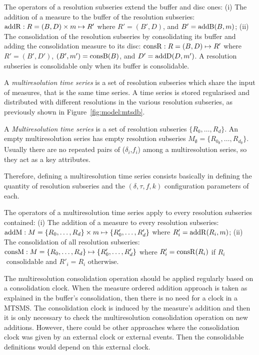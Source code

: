The operators of a resolution subseries extend the buffer and disc
ones: (i) The addition of a measure to the buffer of the resolution
subseries: $\operatorname{addR} : R=(B,D) \times m \mapsto R'$ where $R'= (B',D)$,
and $B'= \operatorname{addB}(B,m)$; (ii) The consolidation of the resolution
subseries by consolidating its buffer and adding the consolidation
measure to its disc: $\operatorname{consR} : R=(B,D) \mapsto R'$ where $R'=
(B',D')$, $(B',m') = \operatorname{consB}(B)$, and $D'= \operatorname{addD}(D,m')$.  A resolution
subseries is consolidable only when its buffer is consolidable.




A \emph{multiresolution time series} is a set of resolution subseries
which share the input of measures, that is the same time series. A
time series is stored regularised and distributed with different
resolutions in the various resolution subseries, as previously shown
in Figure~\ref{fig:model:mtsdb}.
\begin{definition}%
  A \emph{Mul\-ti\-re\-solution time series} is a set of resolution
  subseries $\{R_0, \dots, R_d\}$.  An empty multiresolution series
  has empty resolution subseries $M_{\emptyset}=\{R_{0_\emptyset},
  \dots, R_{d_\emptyset}\}$. Usually there are no repeated pairs of
  ($\delta_i$,$f_i$) among a multiresolution series, so they act as a
  key attributes.
\end{definition}

Therefore, defining a multiresolution time series consists basically
in defining the quantity of resolution subseries and the
$(\delta,\tau,f,k)$ configuration parameters of each.


The operators of a multiresolution time series apply to every
resolution subseries contained: (i) The addition of a measure to every
resolution subseries: $\operatorname{addM} : M=\{R_0,\allowbreak \dots,\allowbreak
R_d\} \times m \mapsto \{R'_0, \dots,\allowbreak R'_d\}$ where
$R'_i=\operatorname{addR}(R_i,m)$; (ii) The consolidation of all resolution
subseries: $\operatorname{consM} : M=\{R_0,\allowbreak \dots,\allowbreak R_d\}
\mapsto \{R'_0,\allowbreak \dots,\allowbreak R'_d\}$ where $R'_i =
\operatorname{consR}(R_i)$ if $R_i$ $\text{ consolidable}$ and $R'_i=R_i$
$\text{otherwise}$.


The multiresolution consolidation operation should be applied
regularly based on a consolidation clock. When the measure ordered
addition approach is taken as explained in the buffer's consolidation,
then there is no need for a clock in a MTSMS. The consolidation clock
is induced by the measure's addition and then it is only necessary to
check the multiresolution consolidation operation on new
additions. However, there could be other approaches where the
consolidation clock was given by an external clock or external
events. Then the consolidable definitions would depend on this
external clock.


